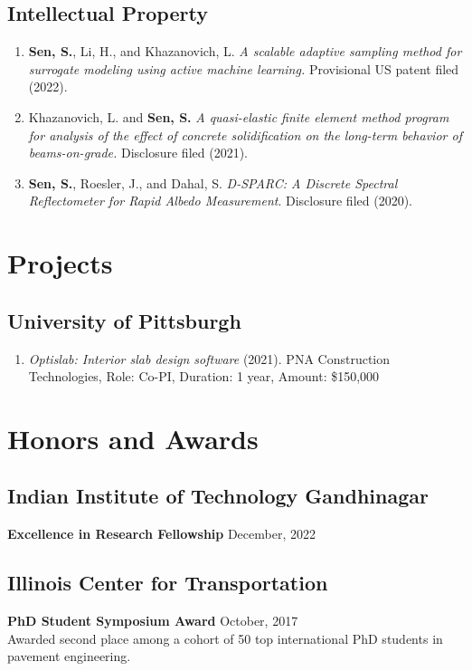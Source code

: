 \documentclass[12pt]{article}
\begin{document}
\hfill
\subsection*{Intellectual Property}
\begin{enumerate}[label=(IP\arabic*)]
	\item \textbf{Sen, S.}, Li, H., and  Khazanovich, L. \textit{A scalable adaptive sampling method for surrogate modeling using active machine learning.} Provisional US patent filed (2022).
	\item Khazanovich, L. and \textbf{Sen, S.} \textit{A quasi-elastic finite element method program for analysis of the effect of concrete solidification on the long-term behavior of beams-on-grade.} Disclosure filed (2021).
	\item \textbf{Sen, S.}, Roesler, J., and Dahal, S. \textit{D-SPARC: A Discrete Spectral Reflectometer for Rapid Albedo Measurement}. Disclosure filed (2020). 
\end{enumerate} 

\bigskip
\section*{Projects}
\hfill
\subsection*{University of Pittsburgh}
\begin{enumerate}[label=(P\arabic*)]
	\item \textit{Optislab: Interior slab design software} (2021). PNA Construction Technologies, Role: Co-PI, Duration: 1 year, Amount: \$150,000
\end{enumerate}

\bigskip
\section*{Honors and Awards}
\hfill
\subsection*{Indian Institute of Technology Gandhinagar}
\textbf{Excellence in Research Fellowship} \hfill December, 2022 \\

\subsection*{Illinois Center for Transportation}
\textbf{PhD Student Symposium Award} \hfill October, 2017 \\
Awarded second place among a cohort of 50 top international PhD students in pavement engineering. \\
\end{document}
